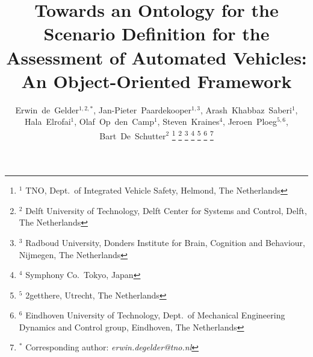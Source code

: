 \documentclass[journal]{IEEEtran}
\theoremstyle{plain}
\theoremstyle{remark}\newtheorem{remarkenv}{Remark}        %
\newcommand{\cstartd}{\color{red}}  %
\newcommand{\cendd}{\color{black}}
\begin{document}
\date{}


\title{\cstartd Towards an Ontology for the Scenario Definition for the Assessment of Automated Vehicles: An Object-Oriented Framework \cendd}

\author{Erwin~de~Gelder$^{1,2,*}$,
	    Jan-Pieter~Paardekooper$^{1,3}$,
	    Arash~Khabbaz~Saberi$^{1}$,
	    Hala~Elrofai$^{1}$,
	    Olaf~Op~den~Camp$^{1}$,
	    Steven~Kraines$^{4}$,
	    Jeroen~Ploeg$^{5,6}$,
	    Bart~De~Schutter$^{2}$%
\thanks{$^1$ TNO, Dept.\ of Integrated Vehicle Safety, Helmond, The Netherlands}%
\thanks{$^2$ Delft University of Technology, Delft Center for Systems and Control, Delft, The Netherlands}%
\thanks{$^3$ Radboud University, Donders Institute for Brain, Cognition and Behaviour, Nijmegen, The Netherlands}%
\thanks{$^4$ Symphony Co.\ Tokyo, Japan}%
\thanks{$^5$ 2getthere, Utrecht, The Netherlands}%
\thanks{$^6$ Eindhoven University of Technology, Dept.\ of Mechanical Engineering Dynamics and Control group, Eindhoven, The Netherlands}%
\thanks{$^*$ Corresponding author: \textit{erwin.degelder@tno.nl}}}%


\maketitle

\acresetall






%






\printbibliography
%
%

\appendices

\end{document}

